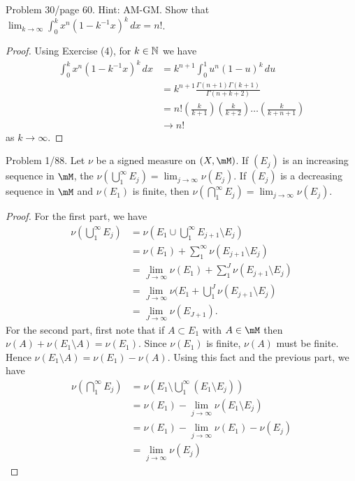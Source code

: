 \documentclass{article}
\begin{document}
 Problem 30/page 60. Hint: AM-GM. Show that $\lim_{k \to \infty} \int_0^k x^n (1 - k^{-1} x) ^k \, dx = n!$.
\begin{proof}
Using Exercise (4), for $k \in \mathbb{N}$ we have
\begin{align*}
\int_0^k x^n (1 - k^{-1} x) ^k \, dx & =  k^{n+1} \int_0^1 u^n (1 - u)^k   \, du
\\ & =  k^{n+1} \frac{\Gamma(n+1) \Gamma(k+1)}{\Gamma(n + k + 2)}
\\ & =  n! \left( \frac k {k +1} \right) \left( \frac k {k +2} \right) \ldots \left( \frac k {k +n +1} \right)
\\ & \to n!
\end{align*}
as $k \to \infty$.
\end{proof}

 Problem 1/88. Let $\nu$ be a signed measure on $(X, \mM)$. If $(E_j)$ is an increasing sequence in $\mM$, the $\nu(\bigcup_1^\infty E_j) = \lim_{j \to \infty} \nu(E_j)$. If $(E_j)$ is a decreasing sequence in $\mM$ and $\nu(E_1)$ is finite, then $\nu(\bigcap_1^\infty E_j) = \lim_{j \to \infty} \nu(E_j)$.
\begin{proof}
For the first part, we have
\begin{align*}
\nu(\bigcup_1^\infty E_j) & = \nu(E_1 \cup \bigcup_1^\infty E_{j+1} \setminus E_j)  
\\ & = \nu(E_1) + \sum_1^\infty \nu(E_{j+1} \setminus E_j)
\\ & = \lim_{J \to \infty} \nu(E_1) + \sum_1^J \nu(E_{j+1} \setminus E_j)
\\ & = \lim_{J \to \infty} \nu(E_1 + \bigcup_1^J \nu(E_{j+1} \setminus E_j)
\\ & = \lim_{J \to \infty} \nu(E_{J+1}).
\end{align*}
For the second part, first note that if $A \subset E_1$ with $A \in \mM$ then $\nu(A) + \nu(E_1 \setminus A) = \nu(E_1)$. Since $\nu(E_1)$ is finite, $\nu(A)$ must be finite. Hence $\nu(E_1 \setminus A) = \nu(E_1) - \nu(A)$.  Using this fact and the previous part, we have
\begin{align*}
\nu(\bigcap_1^\infty E_j) & = \nu(E_1 \setminus \bigcup_1^\infty (E_1 \setminus E_j))
\\ & = \nu(E_1) - \lim_{j \to \infty} \nu(E_1 \setminus E_j)
\\ & = \nu(E_1) - \lim_{j \to \infty} \nu(E_1) - \nu(E_j)
\\ & = \lim_{j \to \infty} \nu(E_j)
\end{align*}
\end{proof}
\end{document}
